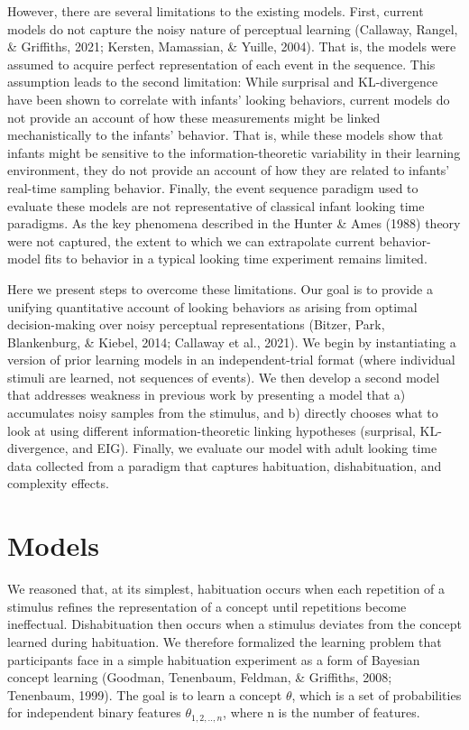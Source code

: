 \documentclass[10pt, letterpaper]{article}
\begin{document}
However, there are several limitations to the existing models. First,
current models do not capture the noisy nature of perceptual learning
(Callaway, Rangel, \& Griffiths, 2021; Kersten, Mamassian, \& Yuille,
2004). That is, the models were assumed to acquire perfect
representation of each event in the sequence. This assumption leads to
the second limitation: While surprisal and KL-divergence have been shown
to correlate with infants' looking behaviors, current models do not
provide an account of how these measurements might be linked
mechanistically to the infants' behavior. That is, while these models
show that infants might be sensitive to the information-theoretic
variability in their learning environment, they do not provide an
account of how they are related to infants' real-time sampling behavior.
Finally, the event sequence paradigm used to evaluate these models are
not representative of classical infant looking time paradigms. As the
key phenomena described in the Hunter \& Ames (1988) theory were not
captured, the extent to which we can extrapolate current behavior-model
fits to behavior in a typical looking time experiment remains limited.

Here we present steps to overcome these limitations. Our goal is to
provide a unifying quantitative account of looking behaviors as arising
from optimal decision-making over noisy perceptual representations
(Bitzer, Park, Blankenburg, \& Kiebel, 2014; Callaway et al., 2021). We
begin by instantiating a version of prior learning models in an
independent-trial format (where individual stimuli are learned, not
sequences of events). We then develop a second model that addresses
weakness in previous work by presenting a model that a) accumulates
noisy samples from the stimulus, and b) directly chooses what to look at
using different information-theoretic linking hypotheses (surprisal,
KL-divergence, and EIG). Finally, we evaluate our model with adult
looking time data collected from a paradigm that captures habituation,
dishabituation, and complexity effects.

\hypertarget{models}{%
\section{Models}\label{models}}

We reasoned that, at its simplest, habituation occurs when each
repetition of a stimulus refines the representation of a concept until
repetitions become ineffectual. Dishabituation then occurs when a
stimulus deviates from the concept learned during habituation. We
therefore formalized the learning problem that participants face in a
simple habituation experiment as a form of Bayesian concept learning
(Goodman, Tenenbaum, Feldman, \& Griffiths, 2008; Tenenbaum, 1999). The
goal is to learn a concept \(\theta\), which is a set of probabilities
for independent binary features \(\theta_{1,2,..,n}\), where n is the
number of features.
\end{document}
